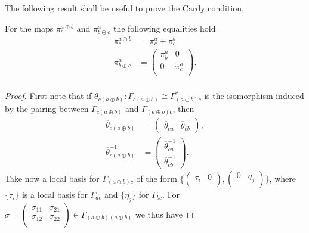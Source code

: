 The following result shall be useful to prove the Cardy condition.

\begin{lemma}\label{cardy_additive}
For the maps $\pi^{a\oplus b}_c$ and $\pi^a_{b\oplus c}$ the following equalities hold
$$
\begin{aligned}
\pi^{a\oplus b}_c &= \pi^a_c+\pi^b_c \\
\pi^a_{b\oplus c} &= \left (\begin{smallmatrix} \pi^a_b & 0 \\ 0 & \pi^a_c \\ \end{smallmatrix} \right ). \\
\end{aligned}
$$
\end{lemma}
\begin{proof}
First note that if $\overline{\theta}_{c(a\oplus b)}:\Gamma_{c(a\oplus b)}\cong \Gamma_{(a\oplus b)c}^*$ is the isomorphism induced by the pairing between $\Gamma_{c(a\oplus b)}$ and $\Gamma_{(a\oplus b)c}$, then
$$
\begin{aligned}
\overline{\theta}_{c(a\oplus b)} &= \left (\begin{smallmatrix} \overline{\theta}_{ca} & \overline{\theta}_{cb}\end{smallmatrix} \right ), \\
\overline{\theta}_{c(a\oplus b)}^{-1} &= \left (\begin{smallmatrix} \overline{\theta}_{ca}^{-1} \\ \overline{\theta}_{cb}^{-1} \end{smallmatrix} \right ).
\end{aligned}
$$
Take now a local basis for $\Gamma_{(a\oplus b)c}$ of the form $\{\left (\begin{smallmatrix} \tau_i & 0 \\ \end{smallmatrix} \right ), \left (\begin{smallmatrix} 0 & \eta_j \\ \end{smallmatrix} \right )\}$, where $\{\tau_i\}$ is a local basis for $\Gamma_{ac}$ and $\{\eta_j\}$ for $\Gamma_{bc}$. For $\sigma =\left (\begin{smallmatrix} \sigma_{11} & \sigma_{21} \\ \sigma_{12} & \sigma_{22} \\\end{smallmatrix} \right )\in \Gamma_{(a\oplus b)(a\oplus b)}$ we thus have

\end{proof}
